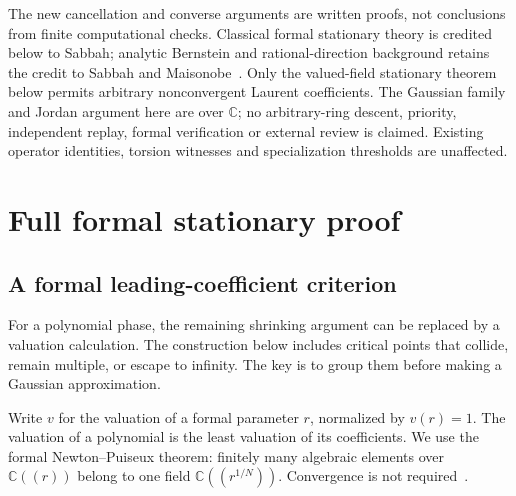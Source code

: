 \documentclass[11pt]{article}
\theoremstyle{definition}\newtheorem{definition}[theorem]{Definition}
\theoremstyle{remark}\newtheorem{remark}[theorem]{Remark}
\newcommand{\C}{\mathbb C}
\begin{document}
The new cancellation and converse arguments are written proofs,
not conclusions from finite computational checks. Classical
formal stationary theory is credited below to Sabbah; analytic
Bernstein and rational-direction background retains the credit
to Sabbah and Maisonobe~\cite[Introduction]{Maisonobe}.
Only the valued-field stationary theorem below permits arbitrary
nonconvergent Laurent coefficients. The Gaussian family and
Jordan argument here are over $\C$; no arbitrary-ring descent,
priority, independent replay, formal verification or external
review is claimed. Existing operator identities, torsion witnesses
and specialization thresholds are unaffected.

\section{Full formal stationary proof}
\subsection{A formal leading-coefficient criterion}\label{sec:stationaryballs}

For a polynomial phase, the remaining shrinking argument can be
replaced by a valuation calculation. The construction below includes
critical points that collide, remain multiple, or escape to infinity.
The key is to group them before making a Gaussian approximation.

Write $v$ for the valuation of a formal parameter $r$, normalized by
$v(r)=1$. The valuation of a polynomial is the least valuation of its
coefficients. We use the formal Newton--Puiseux theorem: finitely many
algebraic elements over $\C((r))$ belong to one field
$\C((r^{1/N}))$. Convergence is not required~\cite[Chapter~2]{Wall}.
\end{document}
